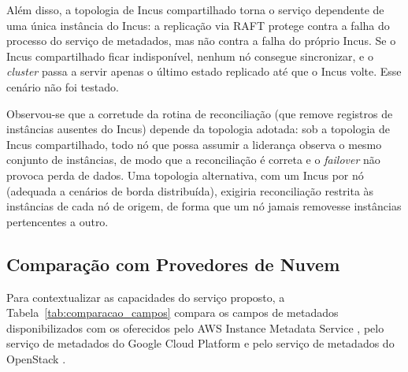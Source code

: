 Além disso, a topologia de Incus compartilhado torna o serviço dependente de uma única instância do Incus: a replicação via RAFT protege contra a falha do processo do serviço de metadados, mas não contra a falha do próprio Incus. Se o Incus compartilhado ficar indisponível, nenhum nó consegue sincronizar, e o \textit{cluster} passa a servir apenas o último estado replicado até que o Incus volte. Esse cenário não foi testado.

Observou-se que a corretude da rotina de reconciliação (que remove registros de instâncias ausentes do Incus) depende da topologia adotada: sob a topologia de Incus compartilhado, todo nó que possa assumir a liderança observa o mesmo conjunto de instâncias, de modo que a reconciliação é correta e o \textit{failover} não provoca perda de dados. Uma topologia alternativa, com um Incus por nó (adequada a cenários de borda distribuída), exigiria reconciliação restrita às instâncias de cada nó de origem, de forma que um nó jamais removesse instâncias pertencentes a outro.

\subsection{Comparação com Provedores de Nuvem}
\label{subsec_comparacao}

Para contextualizar as capacidades do serviço proposto, a Tabela~\ref{tab:comparacao_campos} compara os campos de metadados disponibilizados com os oferecidos pelo AWS Instance Metadata Service \citep{aws_imds}, pelo serviço de metadados do Google Cloud Platform \citep{gcp_metadata} e pelo serviço de metadados do OpenStack \citep{openstack_metadata}.

